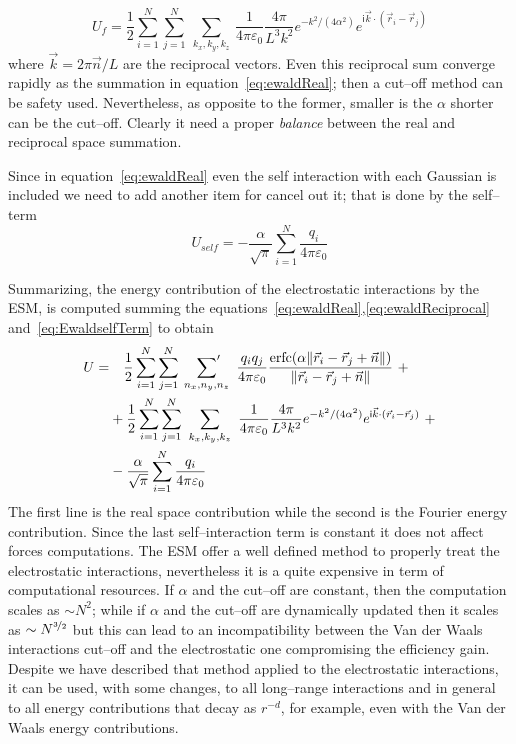 \begin{equation}
	U_f = \frac{1}{2}\sum_{i=1}^N\sum_{j=1}^N\ \sum_{k_x,k_y,k_z}\ \frac{1}{4\pi\varepsilon_0}\frac{4\pi}{L^3k^2}e^{-k^2/(4\alpha^2)}e^{\mathsf{i}{\vec k \cdot (\vec r_i - \vec r_j)}}
	\label{eq:ewaldReciprocal}
\end{equation}
where $\vec k = 2\pi\vec n/L$ are the reciprocal vectors. Even this reciprocal sum converge rapidly as the summation in equation~\eqref{eq:ewaldReal}; then a cut--off method can be safety used. Nevertheless, as opposite to the former, smaller is the $\alpha$ shorter can be the cut--off. Clearly it need a proper \textit{balance} between the real and reciprocal space summation.

Since in equation~\eqref{eq:ewaldReal} even the self interaction with each Gaussian is included we need to add another item for cancel out it; that is done by the self--term
\begin{equation}
	U_{self} = -\frac{\alpha}{\sqrt{\pi}}\sum_{i=1}^N\frac{q_i}{4\pi\varepsilon_0}
	\label{eq:EwaldselfTerm}
\end{equation}

Summarizing, the energy contribution of the electrostatic interactions by the \ac{ESM}, is computed summing the equations~\eqref{eq:ewaldReal},\eqref{eq:ewaldReciprocal} and~\eqref{eq:EwaldselfTerm} to obtain
\begin{equation}
	\begin{aligned}
		U =&\quad\frac{1}{2}\sum_{i=1}^N\sum_{j=1}^N\ \sideset{}{'}\sum_{n_x,n_y,n_z}\ \frac{q_iq_j}{4 \pi \varepsilon_0} \frac{\erfc{(\alpha \| \vec r_i - \vec r_j + \vec n \|)}}{\| \vec r_i - \vec r_j + \vec n \|}\ + \\
		 &+ \frac{1}{2}\sum_{i=1}^N\sum_{j=1}^N\ \sum_{k_x,k_y,k_z}\  \frac{1}{4\pi\varepsilon_0}\frac{4\pi}{L^3k^2}e^{-k^2/(4\alpha^2)}e^{\mathsf{i}{\vec k \cdot (\vec r_i - \vec r_j)}}\ + \\
		 &- \frac{\alpha}{\sqrt{\pi}}\sum_{i=1}^N\frac{q_i}{4\pi\varepsilon_0}
	\end{aligned}
	\label{eq:EwaldEnergy}
\end{equation}
The first line is the real space contribution while the second is the Fourier energy contribution. Since the last self--interaction term is constant it does not affect forces computations. The \ac{ESM} offer a well defined method to properly treat the electrostatic interactions, nevertheless it is a quite expensive in term of computational resources. If $\alpha$ and the cut--off are constant, then the computation scales as $\sim N^2$; while if $\alpha$ and the cut--off are dynamically updated then it scales as $\sim N^{\nicefrac{3}{2}}$ but this can lead to an incompatibility between the Van der Waals interactions cut--off and the electrostatic one compromising the efficiency gain. Despite we have described that method applied to the electrostatic interactions, it can be used, with some changes, to all long--range interactions and in general to all energy contributions that decay as $r^{-d}$, for example, even with the Van der Waals energy contributions.

